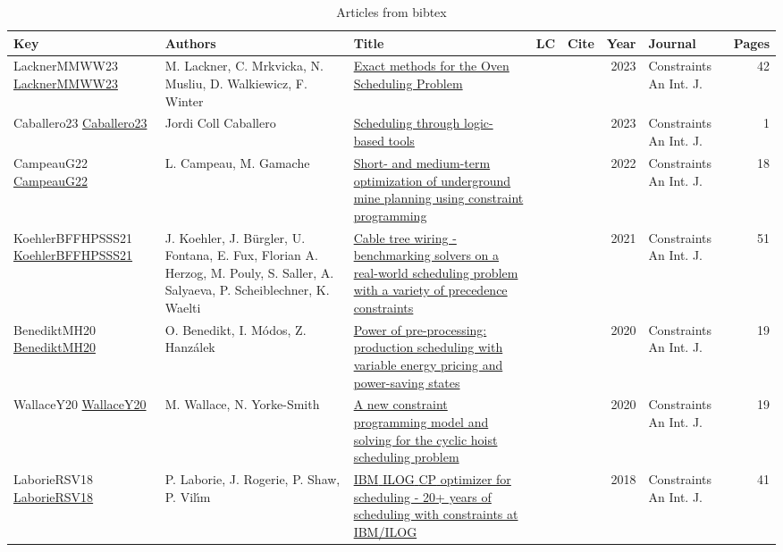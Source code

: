 {\scriptsize
\begin{longtable}{p{3cm}p{6cm}p{7cm}rrrp{3cm}r}
\caption{Articles from bibtex}\\ \toprule
Key& Authors & Title & LC & Cite & Year & Journal & Pages \\ \midrule\endhead
\bottomrule
\endfoot
LacknerMMWW23 \href{https://doi.org/10.1007/s10601-023-09347-2}{LacknerMMWW23} & M. Lackner, C. Mrkvicka, N. Musliu, D. Walkiewicz, F. Winter & \href{articles/LacknerMMWW23.pdf}{Exact methods for the Oven Scheduling Problem} &  & \cite{LacknerMMWW23} & 2023 & Constraints An Int. J. & 42\\
Caballero23 \href{https://doi.org/10.1007/s10601-023-09357-0}{Caballero23} & Jordi Coll Caballero & \href{articles/Caballero23.pdf}{Scheduling through logic-based tools} &  & \cite{Caballero23} & 2023 & Constraints An Int. J. & 1\\
CampeauG22 \href{https://doi.org/10.1007/s10601-022-09337-w}{CampeauG22} & L. Campeau, M. Gamache & \href{articles/CampeauG22.pdf}{Short- and medium-term optimization of underground mine planning using constraint programming} &  & \cite{CampeauG22} & 2022 & Constraints An Int. J. & 18\\
KoehlerBFFHPSSS21 \href{https://doi.org/10.1007/s10601-021-09321-w}{KoehlerBFFHPSSS21} & J. Koehler, J. B{\"{u}}rgler, U. Fontana, E. Fux, Florian A. Herzog, M. Pouly, S. Saller, A. Salyaeva, P. Scheiblechner, K. Waelti & \href{articles/KoehlerBFFHPSSS21.pdf}{Cable tree wiring - benchmarking solvers on a real-world scheduling problem with a variety of precedence constraints} &  & \cite{KoehlerBFFHPSSS21} & 2021 & Constraints An Int. J. & 51\\
BenediktMH20 \href{https://doi.org/10.1007/s10601-020-09317-y}{BenediktMH20} & O. Benedikt, I. M{\'{o}}dos, Z. Hanz{\'{a}}lek & \href{articles/BenediktMH20.pdf}{Power of pre-processing: production scheduling with variable energy pricing and power-saving states} &  & \cite{BenediktMH20} & 2020 & Constraints An Int. J. & 19\\
WallaceY20 \href{https://doi.org/10.1007/s10601-020-09316-z}{WallaceY20} & M. Wallace, N. Yorke{-}Smith & \href{articles/WallaceY20.pdf}{A new constraint programming model and solving for the cyclic hoist scheduling problem} &  & \cite{WallaceY20} & 2020 & Constraints An Int. J. & 19\\
LaborieRSV18 \href{https://doi.org/10.1007/s10601-018-9281-x}{LaborieRSV18} & P. Laborie, J. Rogerie, P. Shaw, P. Vil{\'{\i}}m & \href{articles/LaborieRSV18.pdf}{{IBM} {ILOG} {CP} optimizer for scheduling - 20+ years of scheduling with constraints at {IBM/ILOG}} &  & \cite{LaborieRSV18} & 2018 & Constraints An Int. J. & 41\\

\end{longtable}}
